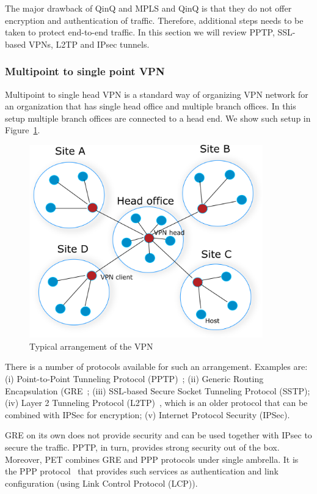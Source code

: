 The major drawback of QinQ and MPLS and QinQ is that they do not offer encryption and 
authentication of traffic. Therefore, additional steps needs to be taken to protect end-to-end
traffic. In this section we will review PPTP, SSL-based VPNs, L2TP and IPsec tunnels.

\subsubsection{Multipoint to single point VPN}

Multipoint to single head VPN is a standard way of organizing VPN network
for an organization that has single head office and multiple branch offices.
In this setup multiple branch offices are connected to a head end. 
We show such setup in Figure~\ref{fig:head-vpn}.

\begin{figure}[ht!]
    \centering
    \includegraphics[width=0.9\textwidth]{graphics/vpn-central.png}
    \caption{Typical arrangement of the VPN}
    \label{fig:head-vpn}
\end{figure}

There is a number of protocols available for such an arrangement. Examples are:
(i) Point-to-Point Tunneling Protocol (PPTP)~\cite{tcpip}; (ii) Generic Routing Encapsulation (GRE~\cite{tcpip}; 
(iii) SSL-based Secure Socket Tunneling Protocol (SSTP); (iv) Layer 2 Tunneling Protocol (L2TP)~\cite{tcpip}, 
which is an older protocol that can be combined with IPSec for encryption;
(v) Internet Protocol Security (IPSec).

GRE on its own does not provide security and can be used together with IPsec to secure 
the traffic. PPTP, in turn, provides strong security out of the box. Moreover, PET combines 
GRE and PPP protocols under single ambrella. It is the PPP protocol~\cite{tcpip}
that provides such services as authentication and link configuration (\ie using Link Control Protocol (LCP)).

